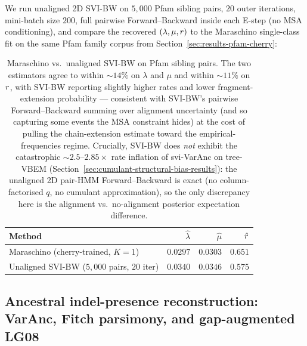 We run unaligned 2D SVI-BW
on $5{,}000$ Pfam sibling pairs, $20$ outer iterations,
mini-batch size $200$, full pairwise Forward--Backward inside
each E-step (no MSA conditioning), and compare the recovered
$(\lambda, \mu, r)$ to the Maraschino single-class fit on the
same Pfam family corpus from
Section~\ref{sec:results-pfam-cherry}:

\begin{table}[ht]
\centering\small
\begin{tabular}{lrrr}
\toprule
Method & $\hat\lambda$ & $\hat\mu$ & $\hat{r}$ \\
\midrule
Maraschino (cherry-trained, $K=1$) & $0.0297$ & $0.0303$ & $0.651$ \\
Unaligned SVI-BW ($5{,}000$ pairs, $20$ iter)
                                   & $0.0340$ & $0.0346$ & $0.575$ \\
\bottomrule
\end{tabular}
\caption{Maraschino vs.\ unaligned SVI-BW on Pfam sibling pairs.
The two estimators agree to within $\sim 14\%$ on $\lambda$ and
$\mu$ and within $\sim 11\%$ on $r$, with SVI-BW reporting
slightly higher rates and lower fragment-extension probability
--- consistent with SVI-BW's pairwise Forward--Backward summing
over alignment uncertainty (and so capturing some events the MSA
constraint hides) at the cost of pulling the chain-extension
estimate toward the empirical-frequencies regime.  Crucially,
SVI-BW does \emph{not} exhibit the catastrophic
$\sim 2.5$--$2.85\times$ rate inflation of svi-VarAnc on
tree-VBEM (Section~\ref{sec:cumulant-structural-bias-results}):
the unaligned 2D pair-HMM Forward--Backward is exact (no
column-factorised $q$, no cumulant approximation), so the only
discrepancy here is the alignment vs.\ no-alignment posterior
expectation difference.}
\label{tab:maraschino-vs-svibw}
\end{table}

\subsection{Ancestral indel-presence reconstruction: VarAnc, Fitch parsimony, and gap-augmented LG08}
\label{sec:results-varanc-vs-fitch}

